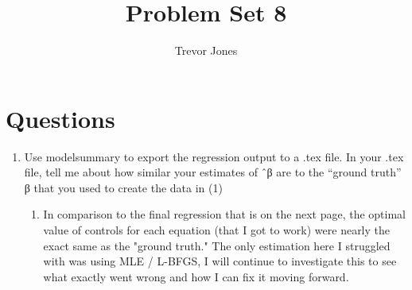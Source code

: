 \documentclass{article}
\title{Problem Set 8}
\author{Trevor Jones}
\begin{document}
\maketitle

\section{Questions}
\begin{enumerate}
    \item Use modelsummary to export the regression output to a .tex file. In your .tex file, tell me about how similar your estimates of ˆβ are to the “ground truth” β that you used to create the data in (1)
    \begin{enumerate}
        \item In comparison to the final regression that is on the next page, the optimal value of controls for each equation (that I got to work) were nearly the exact same as the "ground truth." The only estimation here I struggled with was using MLE / L-BFGS, I will continue to investigate this to see what exactly went wrong and how I can fix it moving forward. 
    \end{enumerate}
\end{enumerate}
\pagebreak
\end{document}
